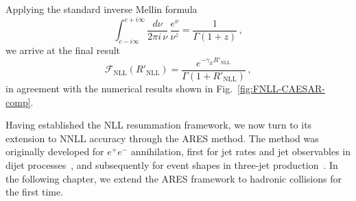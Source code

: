 Applying the standard inverse Mellin formula
\begin{equation}
    \int_{c-i\infty}^{c+i\infty}\frac{d\nu}{2\pi i\,\nu}\,\frac{e^\nu}{\nu^{z}} 
    = \frac{1}{\Gamma(1+z)}\,,
\end{equation}
we arrive at the final result
\begin{equation}
\label{eq:FNLL-add-final}
    \mathcal{F}_{\mathrm{NLL}}\!\left(R'_{\mathrm{NLL}}\right) 
    = \frac{e^{-\gamma_E R'_{\mathrm{NLL}}}}{\Gamma\!\left(1+R'_{\mathrm{NLL}}\right)}\,,
\end{equation}
in agreement with the numerical results shown in Fig.~\ref{fig:FNLL-CAESAR-comp}.

Having established the NLL resummation framework, we now turn 
to its extension to NNLL accuracy through the \textsc{ARES} method. 
The method was originally developed for $e^+e^-$ annihilation, first for jet rates and jet observables in dijet processes~\cite{Banfi:2014sua,Banfi:2016zlc,Banfi:2018mcq}, and subsequently for event shapes in three-jet production~\cite{Arpino:2019ozn}. In the following chapter, we extend the \textsc{ARES} framework to hadronic collisions for the first time.

